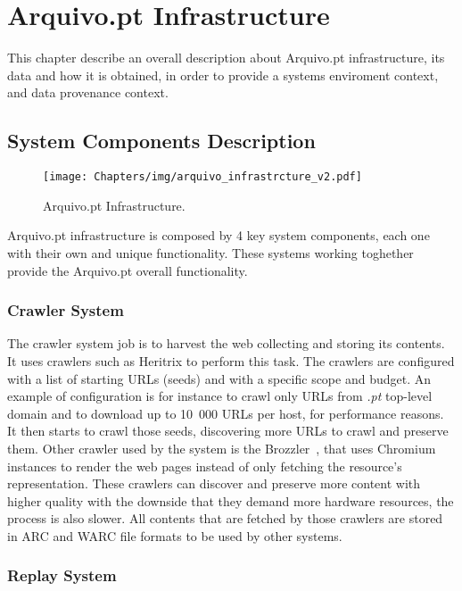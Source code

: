 \chapter{Arquivo.pt Infrastructure}

This chapter describe an overall description about Arquivo.pt infrastructure, its data and how it is obtained, in order to provide a systems enviroment context, and data provenance context.

\section{System Components Description}


\begin{figure}[H]
    \centering
    \texttt{[image: Chapters/img/arquivo\_infrastrcture\_v2.pdf]}
    \caption{Arquivo.pt Infrastructure.}
    \label{fig:arquivo_infrastructure}
\end{figure}

Arquivo.pt infrastructure is composed by 4 key system components, each one with their own and unique functionality. These systems working toghether provide the Arquivo.pt overall functionality.

\subsection{Crawler System}

The crawler system job is to harvest the web collecting and storing its contents. It uses crawlers such as Heritrix to perform this task. The crawlers are configured with a list of starting URLs (seeds) and with a specific scope and budget. An example of configuration is for instance to crawl only URLs from \emph{.pt} top-level domain and to download up to 10~000 URLs per host, for performance reasons. It then starts to crawl those seeds, discovering more URLs to crawl and preserve them.
Other crawler used by the system is the Brozzler~\cite{brozzler}, that uses Chromium instances to render the web pages instead of only fetching the resource's representation. These crawlers can discover and preserve more content with higher quality with the downside that they demand more hardware resources, the process is also slower. All contents that are fetched by those crawlers are stored in ARC and WARC file formats to be used by other systems.

\subsection{Replay System}

